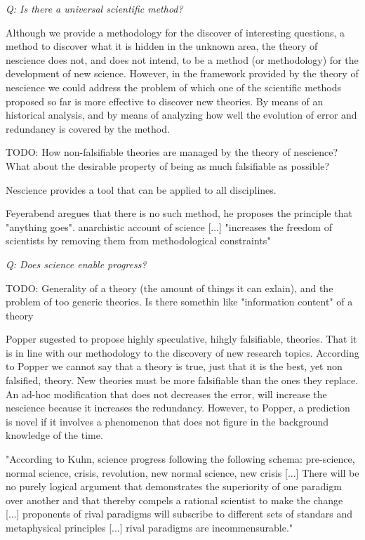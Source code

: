 
\emph{Q: Is there a universal scientific method?}

Although we provide a methodology for the discover of interesting questions, a method to discover what it is hidden in the unknown area, the theory of nescience does not, and does not intend, to be a method (or methodology) for the development of new science. However, in the framework provided by the theory of nescience we could address the problem of which one of the scientific methods proposed so far is more effective to discover new theories. By means of an historical analysis, and by means of analyzing how well the evolution of error and redundancy is covered by the method.

{\color{red} TODO: How non-falsifiable theories are managed by the theory of nescience? What about the desirable property of being as much falsifiable as possible?}

Nescience provides a tool that can be applied to all disciplines. 

Feyerabend aregues that there is no such method, he proposes the principle that "anything goes". anarchistic account of science [...] "increases the freedom of scientists by removing them from methodological constraints"

\vskip 0.5cm


\emph{Q: Does science enable progress?}

{\color{red} TODO: Generality of a theory (the amount of things it can exlain), and the problem of too generic theories. Is there somethin like "information content" of a theory}

Popper sugested to propose highly speculative, hihgly falsifiable, theories. That it is in line with our methodology to the discovery of new research topics. According to Popper we cannot say that a theory is true, just that it is the best, yet non falsified, theory. New theories must be more falsifiable than the ones they replace. An ad-hoc modification that does not decreases the error, will increase the nescience because it increases the redundancy. However, to Popper, a prediction is novel if it involves a phenomenon that does not figure in the background knowledge of the time.


"According to Kuhn, science progress following the following schema: pre-science, normal science, crisis, revolution, new normal science, new crisis [...] There will be no purely logical argument that demonstrates the superiority of one paradigm over another and that thereby compels a rational scientist to make the change [...] proponents of rival paradigms will subscribe to different sets of standars and metaphysical principles [...] rival paradigms are incommensurable."

